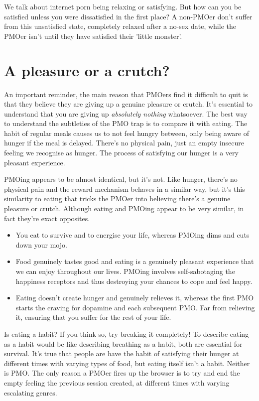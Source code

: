 \documentclass[easypeasy.tex]{subfiles}
\begin{document}
We talk about internet porn being relaxing or satisfying. But how can you be satisfied unless you were dissatisfied in the first place? A non-PMOer don't suffer from this unsatisfied state, completely relaxed after a no-sex date, while the PMOer isn't until they have satisfied their 'little monster'.

\section{A pleasure or a crutch?}
An important reminder, the main reason that PMOers find it difficult to quit is that they believe they are giving up a genuine pleasure or crutch. It's essential to understand that you are giving up \textit{absolutely nothing} whatsoever. The best way to understand the subtleties of the PMO trap is to compare it with eating. The habit of regular meals causes us to not feel hungry between, only being aware of hunger if the meal is delayed. There's no physical pain, just an empty insecure feeling we recognise as hunger. The process of satisfying our hunger is a very pleasant experience.

PMOing appears to be almost identical, but it's not. Like hunger, there's no physical pain and the reward mechanism behaves in a similar way, but it's this similarity to eating that tricks the PMOer into believing there's a genuine pleasure or crutch. Although eating and PMOing appear to be very similar, in fact they're exact opposites.

\begin{itemize}
  \item You eat to survive and to energise your life, whereas PMOing dims and cuts down your mojo.
  \item Food genuinely tastes good and eating is a genuinely pleasant experience that we can enjoy throughout our lives. PMOing involves self-sabotaging the happiness receptors and thus destroying your chances to cope and feel happy.
  \item Eating doesn't create hunger and genuinely relieves it, whereas the first PMO starts the craving for dopamine and each subsequent PMO. Far from relieving it, ensuring that you suffer for the rest of your life.
  \end{itemize}

Is eating a habit? If you think so, try breaking it completely! To describe eating as a habit would be like describing breathing as a habit, both are essential for survival. It's true that people are have the habit of satisfying their hunger at different times with varying types of food, but eating itself isn't a habit. Neither is PMO. The only reason a PMOer fires up the browser is to try and end the empty feeling the previous session created, at different times with varying escalating genres.
\end{document}

